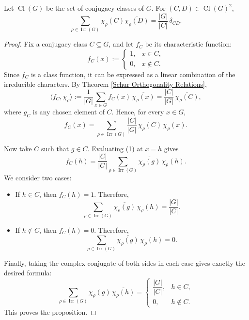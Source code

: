 \begin{thm}
\label{thm:second_orth}
Let \(\operatorname{Cl}(G)\) be the set of conjugacy classes of \(G\). For   \((C, D )\in \operatorname{Cl}(G)^2\), 
\[
\sum_{\rho \in \operatorname{Irr}(G)} \chi_\rho(C) \overline{\chi_\rho(D)}
=
\frac{|G|}{|C|} \, \delta_{CD}.
\]

\end{thm}
\begin{proof}
Fix a conjugacy class \(C \subseteq G\), and let \(f_C\) be its characteristic function:
\[
f_C(x) :=
\begin{cases}
1, & x \in C, \\
0, & x \notin C.
\end{cases}
\]
Since \(f_C\) is a class function, it can be expressed as a linear combination of the irreducible characters. By Theorem \ref{Schur Orthogonality Relations},
\[
\langle f_C, \chi_\rho \rangle
:= \frac{1}{|G|} \sum_{x \in G} f_C(x) \, \overline{\chi_\rho(x)}
= \frac{|C|}{|G|} \, \overline{\chi_\rho(C)},
\]
where \(g_C\) is any chosen element of \(C\). Hence, for every \(x \in G\),
\[
f_C(x)
= \sum_{\rho \in \operatorname{Irr}(G)}
  \frac{|C|}{|G|} \, \overline{\chi_\rho(C)} \, \chi_\rho(x). \tag{1}
\]

Now take \(C \) such that $g\in C$. Evaluating (1) at \(x = h\) gives
\[
f_{C}(h)
= \frac{|C|}{|G|}
  \sum_{\rho \in \operatorname{Irr}(G)}
  \overline{\chi_\rho(g)} \, \chi_\rho(h).
\]
We consider two cases:

\begin{itemize}
\item If \(h \in C\), then \(f_{C}(h) = 1\). Therefore,
\[
\sum_{\rho \in \operatorname{Irr}(G)} \overline{\chi_\rho(g)} \, \chi_\rho(h)
= \frac{|G|}{|C|}.
\]

\item If \(h \notin C\), then \(f_{C}(h) = 0\). Therefore,
\[
\sum_{\rho \in \operatorname{Irr}(G)} \overline{\chi_\rho(g)} \, \chi_\rho(h)
= 0.
\]
\end{itemize}

Finally, taking the complex conjugate of both sides in each case gives exactly the desired formula:
\[
\sum_{\rho \in \operatorname{Irr}(G)} \chi_\rho(g) \, \overline{\chi_\rho(h)}
=
\begin{cases}
\dfrac{|G|}{|C|}, & h \in C, \\[6pt]
0, & h \notin C.
\end{cases}
\]
This proves the proposition.
\end{proof}